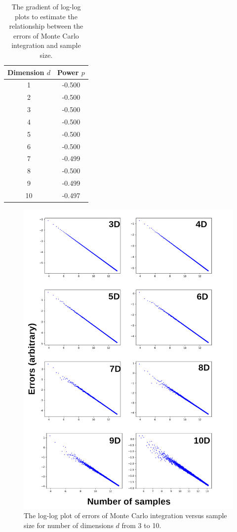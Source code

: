 \documentclass[hyphens,twocolumn,nobalancelastpage,aps,10pt,citeautoscript,longbibliography]{revtex4-2}
\begin{document}
\begin{table}
	\begin{tabular}{ c  c }
		Dimension $d$ & Power $p$ \\
		\hline
		1             & -0.500    \\
		2             & -0.500    \\
		3             & -0.500    \\
		4             & -0.500    \\
		5             & -0.500    \\
		6             & -0.500    \\
		7             & -0.499    \\
		8             & -0.500    \\
		9             & -0.499    \\
		10            & -0.497    \\
	\end{tabular}
	\caption{The gradient of log-log plots to estimate the relationship between the errors of Monte Carlo integration and sample size.}
	\label{tab:slope}
\end{table}

\begin{figure}[htpb] \centering
	\includegraphics[width=1\linewidth]{./assets/monte_carlo/combined_log_errors.png}
	\caption{The log-log plot of errors of Monte Carlo integration versus sample size for number of dimensions $d$ from 3 to 10.}%
	\label{fig:mc_combined_log_errors}
\end{figure}
\end{document}
